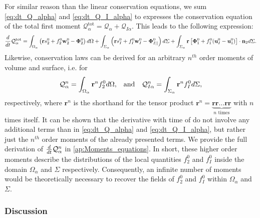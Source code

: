 For similar reason than the linear conservation equations, we sum \ref{eq:dt_Q_alpha} and \ref{eq:dt_Q_I_alpha} to expresses the conservation equation of the total first moment $\mathcal{Q}_\alpha^\text{tot} = \mathcal{Q}_\alpha + \mathcal{Q}_{I\alpha}$.
This leads to the following expression:
\begin{multline}
    \frac{d}{d t} {\mathcal{Q}_\alpha^\text{tot}}
    = \int_{\Omega_\alpha}  \left(
        \textbf{r} s_2^0         
        + f_2^0  \textbf{w}_2^0 
        - \mathbf{\Phi}_2^0
    \right)  d\Omega
    + \int_{\Sigma_\alpha}  \left(
        \textbf{r}s_I^0
        + f_I^0 \textbf{w}_I^0
        - \mathbf{\Phi}_{I||}^0
    \right)  d\Sigma
    + \int_{\Sigma_\alpha}  \textbf{r} \left[
        \mathbf{\Phi}_1^0
        + f_1^0 (\textbf{u}_I^0-\textbf{u}_1^0)
    \right]\cdot \textbf{n}_2   d\Sigma. 
    \label{eq:dt_Q_alpha_tot}
\end{multline}
Likewise, conservation laws can be derived for an arbitrary $n^{th}$ order moments of volume and surface, i.e. for
\begin{align}
    \mathcal{Q}_\alpha^n
    = \int_{\Omega_\alpha} 
        \textbf{r}^n
        f_2^0  d\Omega,
        && \text{and} &&
    \mathcal{Q}_{I\alpha}^n
    = \int_{\Sigma_\alpha} 
        \textbf{r}^n
    f_I^0  d\Sigma,
    \label{eq:Q_n_definition}
\end{align} 
respectively, where $\textbf{r}^n$ is the shorthand for the tensor product $\textbf{r}^n = \underbrace{\textbf{rr}\ldots \textbf{rr}}_{n\text{ times}} $ with $n$ times itself. 
It can be shown that the derivative with time of do not involve any additional terms than in \ref{eq:dt_Q_alpha} and \ref{eq:dt_Q_I_alpha}, but rather just the $n^{th}$ order moments of the already presented terms.
We provide the full derivation of $\frac{d}{d t}{ \mathcal{Q}_\alpha^n}$ in \ref{ap:Moments_equations}.
In short, these higher order moments describe the distributions of the local quantities $f_2^0$ and $f_I^0$ inside the domain $\Omega_\alpha$ and $\Sigma$ respectively.
Consequently, an infinite number of moments would be theoretically necessary to recover the fields of $f_2^0$ and $f_I^0$  within $\Omega_\alpha$ and $\Sigma$. 

\subsubsection{Discussion}

